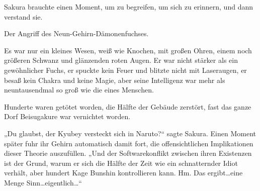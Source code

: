 Sakura brauchte einen Moment, um zu begreifen, um sich zu erinnern, und dann verstand sie.

Der Angriff des Neun-Gehirn-Dämonenfuchses.

Es war nur ein kleines Wesen, weiß wie Knochen, mit großen Ohren, einem noch größeren Schwanz und glänzenden roten Augen. Er war nicht stärker als ein gewöhnlicher Fuchs, er spuckte kein Feuer und blitzte nicht mit Laseraugen, er besaß kein Chakra und keine Magie, aber seine Intelligenz war mehr als neuntausendmal so groß wie die eines Menschen.

Hunderte waren getötet worden, die Hälfte der Gebäude zerstört, fast das ganze Dorf Beisugakure war vernichtet worden.

„Du glaubst, der Kyubey versteckt sich in Naruto?“ sagte Sakura. Einen Moment später fuhr ihr Gehirn automatisch damit fort, die offensichtlichen Implikationen dieser Theorie auszufüllen.
„Und der Softwarekonflikt zwischen ihren Existenzen ist der Grund, warum er sich die Hälfte der Zeit wie ein schnatternder Idiot verhält, aber hundert Kage Bunshin kontrollieren kann. Hm. Das ergibt…eine Menge Sinn…eigentlich…“

